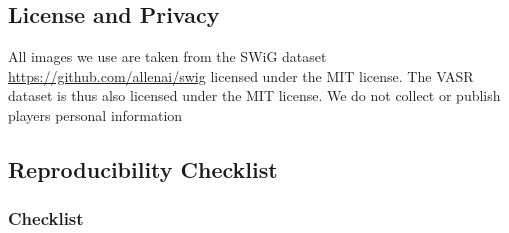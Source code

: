 \documentclass[letterpaper]{article} \usepackage{aaai23}  \usepackage{times}  \usepackage{helvet}  \usepackage{courier}  \usepackage[hyphens]{url}  \usepackage{graphicx} \urlstyle{rm} \def\UrlFont{\rm}  \usepackage{natbib}  \usepackage{caption} \frenchspacing  \setlength{\pdfpagewidth}{8.5in}  \setlength{\pdfpageheight}{11in}  \usepackage{algorithm}
\begin{document}
\subsection{License and Privacy}
All images we use are taken from the SWiG dataset \url{https://github.com/allenai/swig} licensed under the MIT license. The VASR dataset is thus also licensed under the MIT license. We do not collect or publish players personal information

\subsection{Reproducibility Checklist}

\subsubsection{Checklist}
\end{document}
